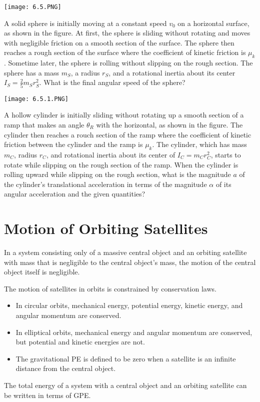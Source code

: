 \documentclass[../mech.tex]{subfiles}
\begin{document}
\ex \begin{center}
    \texttt{[image: 6.5.PNG]}
\end{center}
A solid sphere is initially moving at a constant speed $v_0$ on a horizontal surface, as shown in the figure. At first, the sphere is sliding without rotating and moves with negligible friction on a smooth section of the surface. The sphere then reaches a rough section of the surface 
where the coefficient of kinetic friction is $\mu_k$. Sometime later, the sphere is rolling without slipping on the rough section. The sphere has a mass $m_S$, a radius $r_S$, and a rotational inertia about its center $I_S=\frac{2}{5}m_Sr_S^2$. What is the final angular speed of the sphere?

\ex \begin{center}
    \texttt{[image: 6.5.1.PNG]}
\end{center}
A hollow cylinder is initially sliding without rotating up a smooth section of a ramp that makes an angle $\theta_R$ with the horizontal, as shown in the figure. The cylinder then reaches a rouch section of the ramp where the coefficient of kinetic friction between the cylinder and the ramp is $\mu_k$. 
The cylinder, which has mass $m_C$, radius $r_C$, and rotational inertia about its center of $I_C=m_Cr_C^2$, starts to rotate while slipping on the rough section of the ramp. When the cylinder is rolling upward while slipping on the rough section, what is the magnitude $a$ of the cylinder's translational acceleration in terms of the magnitude $\alpha$ of its angular acceleration and the given quantities?

\section{Motion of Orbiting Satellites}
In a system consisting only of a massive central object and an orbiting satellite with mass that is negligible to the central object's mass, the motion of the central object itself is negligible.

The motion of satellites in orbits is constrained by conservation laws.
\begin{itemize}
    \item In circular orbits, mechanical energy, potential energy, kinetic energy, and angular momentum are conserved.
    \item In elliptical orbits, mechanical energy and angular momentum are conserved, but potential and kinetic energies are not.
    \item The gravitational PE is defined to be zero when a satellite is an infinite distance from the central object.
\end{itemize}
The total energy of a system with a central object and an orbiting satellite can be written in terms of GPE.
\end{document}
